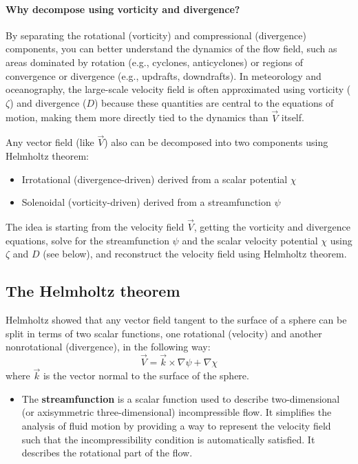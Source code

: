 \paragraph{Why decompose using vorticity and divergence?}
By separating the rotational (vorticity) and compressional (divergence) components, you can better understand the dynamics of the flow field, such as areas dominated by rotation (e.g., cyclones, anticyclones) or regions of convergence or divergence (e.g., updrafts, downdrafts).
In meteorology and oceanography, the large-scale velocity field is often approximated using vorticity ($\zeta$) and divergence ($D$) because these quantities are central to the equations of motion, making them more directly tied to the dynamics than $\vec{V}$ itself.


Any vector field (like $\vec{V}$) also can be decomposed into two components using Helmholtz theorem:
\begin{itemize}
	\item Irrotational (divergence-driven) derived from a scalar potential $\chi$
	\item Solenoidal (vorticity-driven) derived from a streamfunction $\psi$
\end{itemize}
The idea is starting from the velocity field $\vec{V}$, getting the vorticity and divergence equations, solve for the streamfunction $\psi$ and the scalar velocity potential $\chi$ using $\zeta$ and $D$ (see below), and reconstruct the velocity field using Helmholtz theorem.
\subsection{The Helmholtz theorem}
Helmholtz showed that any vector field tangent to the surface of a sphere can be
split in terms of two scalar functions, one rotational (velocity) and another nonrotational (divergence), in the following way:
\begin{equation}\label{eq.helmholtz}
	\vec{V}=\vec{k}\times\nabla\psi+\nabla\chi
\end{equation}
where $\vec{k}$ is the vector normal to the surface of the sphere.
\begin{itemize}
	\item The \textbf{streamfunction} is a scalar function used to describe two-dimensional (or axisymmetric three-dimensional) incompressible flow. It simplifies the analysis of fluid motion by providing a way to represent the velocity field such that the incompressibility condition is automatically satisfied. It describes the rotational part of the flow.
\end{itemize}

